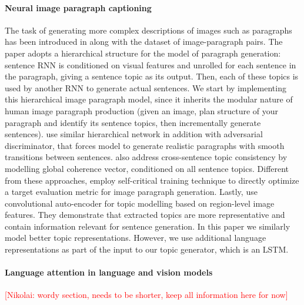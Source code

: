 \documentclass[11pt,a4paper]{article}
\newcommand{\kibitz}[2]{\ifnum\Comments=1\textcolor{#1}{#2}\fi}
\newcommand{\nikolai}[1]{\kibitz{red}      {[Nikolai: #1]}}
\begin{document}
\paragraph{Neural image paragraph captioning}
The task of generating more complex descriptions of images such as paragraphs has been introduced in  along with the dataset of image-paragraph pairs.
The paper adopts a hierarchical structure for the model of paragraph generation: sentence RNN is conditioned on visual features and unrolled for each sentence in the paragraph, giving a sentence topic as its output.
Then, each of these topics is used by another RNN to generate actual sentences.
We start by implementing this hierarchical image paragraph model, since it inherits the modular nature of human image paragraph production (given an image, plan structure of your paragraph and identify its sentence topics, then incrementally generate sentences).
 use similar hierarchical network in addition with adversarial discriminator, that forces model to generate realistic paragraphs with smooth transitions between sentences.
 also address cross-sentence topic consistency by modelling global coherence vector, conditioned on all sentence topics.
Different from these approaches,  employ self-critical training technique \cite{selfcritical2016} to directly optimize a target evaluation metric for image paragraph generation.
Lastly,  use convolutional auto-encoder for topic modelling based on region-level image features. They demonstrate that extracted topics are more representative and contain information relevant for sentence generation.
In this paper we similarly model better topic representations. However, we use additional language representations as part of the input to our topic generator, which is an LSTM.

\paragraph{Language attention in language and vision models}
\nikolai{wordy section, needs to be shorter, keep all information here for now}
\end{document}
